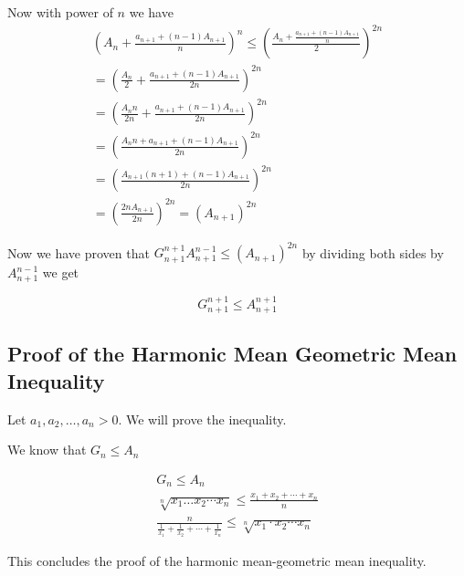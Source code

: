 Now with power of \(n\) we have
\begin{align*}
		{\left( A_{n} + \frac{a_{n + 1} + (n - 1)A_{n + 1}}{n} \right)}^{n} \leq {\left( \frac{A_{n} + \frac{a_{n + 1} + (n - 1)A_{n + 1}}{n}}{2} \right)}^{2n}\\
		= {\left( \frac{A_n}{2} + \frac{a_{n + 1} + (n - 1)A_{n + 1}}{2n}\right)}^{2n}\\
		= {\left( \frac{A_n n}{2n} + \frac{a_{n + 1} + (n - 1)A_{n + 1}}{2n}\right)}^{2n}\\
		= {\left( \frac{A_n n  + a_{n + 1} + (n - 1)A_{n + 1}}{2n}\right)}^{2n}\\
		= {\left( \frac{A_{n + 1}(n + 1) + (n - 1)A_{n + 1}}{2n}\right)}^{2n}\\
		= {\left( \frac{2n A_{n + 1}}{2n}\right)}^{2n} = {\left(A_{n + 1}\right)}^{2n}
\end{align*}

Now we have proven that \(G_{n + 1}^{n + 1} A_{n + 1}^{n - 1}\leq {\left(A_{n + 1}\right)}^{2n}\) 
by dividing both sides by \( A_{n + 1}^{n - 1} \) we get

\[
	G_{n + 1}^{n + 1}\leq A_{n + 1}^{n + 1}
\]

\QED

\subsection{Proof of the Harmonic Mean Geometric Mean Inequality}

Let \( a_1, a_2, \dots, a_n > 0 \). We will prove the inequality.

We know that \(G_n \leq A_n \)

\begin{align*}
		G_n \leq A_n\\
		\sqrt[n]{x_1 \dots x_2 \cdots x_n} \leq \frac{x_1 + x_2 + \cdots + x_n}{n}\\
		\frac{n}{\frac{1}{x_1} + \frac{1}{x_2} + \cdots + \frac{1}{x_n}} \leq \sqrt[n]{x_1 \cdot x_2 \cdots x_n}
\end{align*}

This concludes the proof of the harmonic mean-geometric mean inequality.

\QED